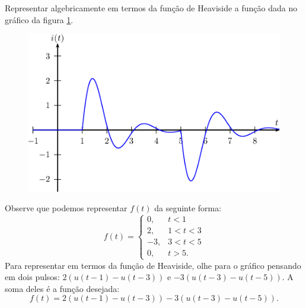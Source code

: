 \documentclass[a4paper,10pt]{book}
\begin{document}
 Representar algebricamente em termos da função de Heaviside a função dada no gráfico da figura \ref{fig_Heaviside_4}.
\begin{figure}[!ht]
\begin{center}

\includegraphics{figs/figura_8}\end{center}
\caption{\label{fig_Heaviside_4}}
\end{figure} 
 Observe que podemos representar $f(t)$ da seguinte forma:
 \begin{equation}
  f(t)=\left\{ \begin{array}{ll} 0, &t<1\\2,&1<t<3\\-3,& 3<t<5\\0,&t>5. \end{array}\right.
 \end{equation}
 Para representar em termos da função de Heaviside, olhe para o gráfico pensando em dois pulsos: $2(u(t-1)-u(t-3))$ e $-3(u(t-3)-u(t-5))$. A soma deles é a função desejada:
 \begin{equation}
 f(t)=2(u(t-1)-u(t-3))-3(u(t-3)-u(t-5)).
 \end{equation}
\end{document}
